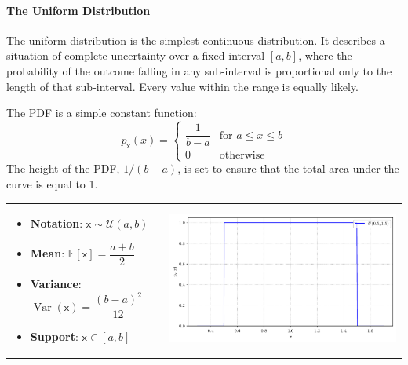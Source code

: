 \paragraph*{The Uniform Distribution}
The uniform distribution is the simplest continuous distribution. It describes a situation of complete uncertainty over a fixed interval $[a, b]$, where the probability of the outcome falling in any sub-interval is proportional only to the length of that sub-interval. Every value within the range is equally likely. 

The PDF is a simple constant function:
\begin{equation}
    p_{\mathsf{x}}(x) = 
    \begin{cases} 
        \dfrac{1}{b-a} & \text{for } a \le x \le b \\[2ex]
        0 & \text{otherwise}
    \end{cases}
\end{equation}
The height of the PDF, $1/(b-a)$, is set to ensure that the total area under the curve is equal to 1.

\begin{tabular}{@{}>{\raggedright\arraybackslash}m{} >{\raggedleft\arraybackslash}m{}@{}}
    \begin{itemize}
        \item \textbf{Notation}: $\mathsf{x} \sim \mathcal{U}(a, b)$
        \item \textbf{Mean}: $\mathbb{E}[\mathsf{x}] = \dfrac{a+b}{2}$
        \item \textbf{Variance}: $\operatorname{Var}(\mathsf{x}) = \dfrac{(b-a)^2}{12}$
        \item \textbf{Support}: $\mathsf{x} \in [a, b]$
    \end{itemize}
    &
    \includegraphics[width=\linewidth]{figs/probability/uniform_pdf.pdf} \\
\end{tabular}

